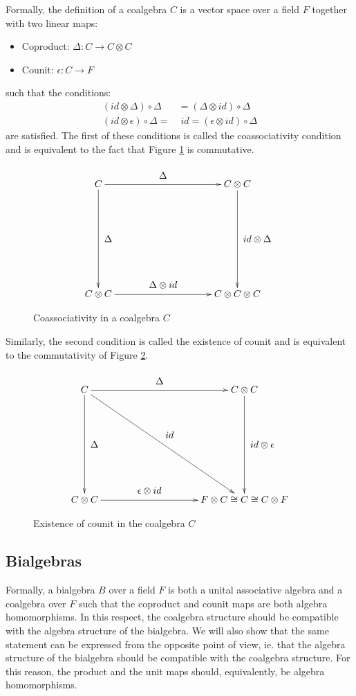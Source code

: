 Formally, the definition of a coalgebra $C$ is a vector space over a field $F$ together with
two linear maps:
\begin{itemize}
    \item Coproduct: $\Delta: C \rightarrow C \otimes C$
    \item Counit: $\epsilon: C \rightarrow F$
\end{itemize}
such that the conditions:
\begin{align}
(id \otimes \Delta) \circ \Delta & = (\Delta \otimes id) \circ \Delta \\
(id \otimes \epsilon) \circ \Delta = &\; id = (\epsilon \otimes id) \circ \Delta
\end{align}
are satisfied. The first of these conditions is called the coassociativity condition and is
equivalent to the fact that Figure \ref{coassoc-coalgebra} is commutative.
\begin{figure}[!h]
  \[
  \xymatrix@=100pt{
    C \ar[r]^-*+{\Delta} \ar[d]^-*+{\Delta}& C \otimes C \ar[d]^-*+{id \otimes \Delta}\\
    C \otimes C \ar[r]^-*+{\Delta \otimes id} & C \otimes C \otimes C \\
  }
  \]
  \caption{Coassociativity in a coalgebra $C$}
  \label{coassoc-coalgebra}
\end{figure}
Similarly, the second condition is called the existence of counit and is equivalent to the
commutativity of Figure \ref{counit-coalgebra}.
\begin{figure}[!h]
  \[
  \xymatrix@=100pt{
    C
       \ar[r]^-*+{\Delta}
       \ar[d]^-*+{\Delta}
       \ar[dr]^-*+{id} & C \otimes C \ar[d]^-*+{id \otimes \epsilon}\\
    C \otimes C \ar[r]^-*+{\epsilon \otimes id} & F \otimes C \cong C \cong C \otimes F \\
  }
  \]
  \caption{Existence of counit in the coalgebra $C$}
  \label{counit-coalgebra}
\end{figure}


\subsection{Bialgebras}


Formally, a bialgebra $B$  over a field $F$ is both a unital associative algebra
and a coalgebra over $F$ such that the coproduct and counit maps are both algebra homomorphisms.
In this respect, the coalgebra structure should be compatible with the algebra structure
of the bialgebra. We will also show that the same statement can be expressed from the
opposite point of view, ie. that the algebra structure of the bialgebra should be
compatible with the coalgebra structure. For this reason, the product and the unit maps
should, equivalently, be algebra homomorphisms.


